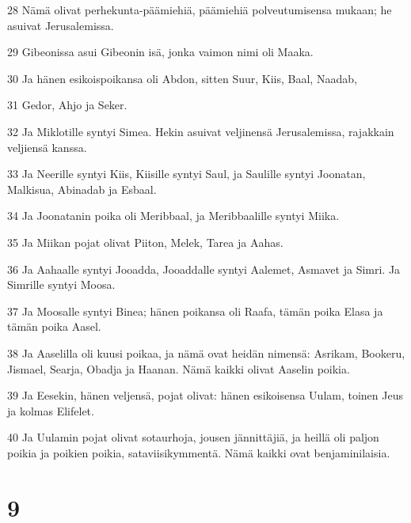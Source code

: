 \par 28 Nämä olivat perhekunta-päämiehiä, päämiehiä polveutumisensa mukaan; he asuivat Jerusalemissa.
\par 29 Gibeonissa asui Gibeonin isä, jonka vaimon nimi oli Maaka.
\par 30 Ja hänen esikoispoikansa oli Abdon, sitten Suur, Kiis, Baal, Naadab,
\par 31 Gedor, Ahjo ja Seker.
\par 32 Ja Miklotille syntyi Simea. Hekin asuivat veljinensä Jerusalemissa, rajakkain veljiensä kanssa.
\par 33 Ja Neerille syntyi Kiis, Kiisille syntyi Saul, ja Saulille syntyi Joonatan, Malkisua, Abinadab ja Esbaal.
\par 34 Ja Joonatanin poika oli Meribbaal, ja Meribbaalille syntyi Miika.
\par 35 Ja Miikan pojat olivat Piiton, Melek, Tarea ja Aahas.
\par 36 Ja Aahaalle syntyi Jooadda, Jooaddalle syntyi Aalemet, Asmavet ja Simri. Ja Simrille syntyi Moosa.
\par 37 Ja Moosalle syntyi Binea; hänen poikansa oli Raafa, tämän poika Elasa ja tämän poika Aasel.
\par 38 Ja Aaselilla oli kuusi poikaa, ja nämä ovat heidän nimensä: Asrikam, Bookeru, Jismael, Searja, Obadja ja Haanan. Nämä kaikki olivat Aaselin poikia.
\par 39 Ja Eesekin, hänen veljensä, pojat olivat: hänen esikoisensa Uulam, toinen Jeus ja kolmas Elifelet.
\par 40 Ja Uulamin pojat olivat sotaurhoja, jousen jännittäjiä, ja heillä oli paljon poikia ja poikien poikia, sataviisikymmentä. Nämä kaikki ovat benjaminilaisia.

\chapter{9}

